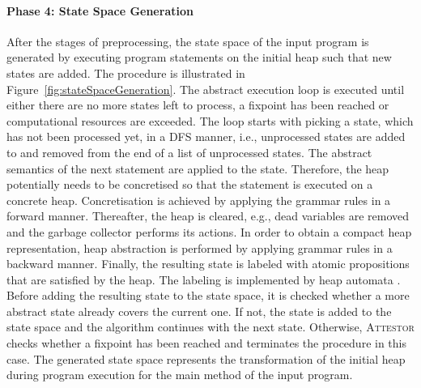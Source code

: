 \documentclass[a4paper, 12pt, twoside]{report}
\begin{document}
	\paragraph{Phase 4: State Space Generation}	
	After the stages of preprocessing, the state space of the input program is generated by executing program statements on the initial heap such that new states are added. The procedure is illustrated in Figure~\ref{fig:stateSpaceGeneration}. The abstract execution loop is executed until either there are no more states left to process, a fixpoint has been reached or computational resources are exceeded. The loop starts with picking a state, which has not been processed yet, in a DFS manner, i.e., unprocessed states are added to and removed from the end of a list of unprocessed states. The abstract semantics of the next statement are applied to the state. Therefore, the heap potentially needs to be concretised so that the statement is executed on a concrete heap. Concretisation is achieved by applying the grammar rules in a forward manner. Thereafter, the heap is cleared, e.g., dead variables are removed and the garbage collector performs its actions. In order to obtain a compact heap representation, heap abstraction is performed by applying grammar rules in a backward manner. Finally, the resulting state is labeled with atomic propositions that are satisfied by the heap. The labeling is implemented by heap automata \cite{arndt2018let}. Before adding the resulting state to the state space, it is checked whether a  more abstract state already covers the current one. If not, the state is added to the state space and the algorithm continues with the next state. Otherwise, \textsc{Attestor} checks whether a fixpoint has been reached and terminates the procedure in this case. The generated state space represents the transformation of the initial heap during program execution for the main method of the input program.
	
\end{document}
